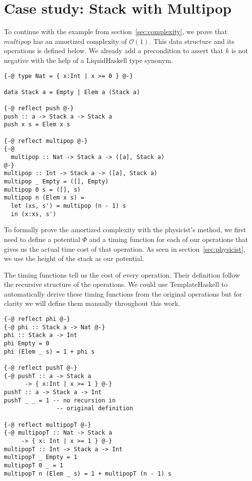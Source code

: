 \documentclass[sigplan,screen]{acmart}
\renewcommand\O[1]{$\mathcal{O}(#1)$}
\begin{document}
\section{Case study: Stack with Multipop}\label{sec:stack}

To continue with the example from section~\ref{sec:complexity}, we prove that $multipop$ has an amortized complexity of \O{1}. This data structure and its operations is defined below. We already add a precondition to assert that $k$ is not negative with the help of a LiquidHaskell type synonym.

\begin{lstlisting}
{-@ type Nat = { x:Int | x >= 0 } @-}

data Stack a = Empty | Elem a (Stack a)

{-@ reflect push @-}
push :: a -> Stack a -> Stack a
push x s = Elem x s

{-@ reflect multipop @-}
{-@
  multipop :: Nat -> Stack a -> ([a], Stack a)
@-}
multipop :: Int -> Stack a -> ([a], Stack a)
multipop _ Empty = ([], Empty)
multipop 0 s = ([], s)
multipop n (Elem x s) =
  let (xs, s') = multipop (n - 1) s
  in (x:xs, s')
\end{lstlisting}

To formally prove the amortized complexity with the physicist's method, we first need to define a potential $\Phi$ and a timing function for each of our operations that gives us the actual time cost of that operation. As seen in section~\ref{sec:physicist}, we use the height of the stack as our potential.

The timing functions tell us the cost of every operation. Their definition follow the recursive structure of the operations. We could use TemplateHaskell to automatically derive these timing functions from the original operations but for clarity we will define them manually throughout this work.

\begin{lstlisting}
{-@ reflect phi @-}
{-@ phi :: Stack a -> Nat @-}
phi :: Stack a -> Int
phi Empty = 0
phi (Elem _ s) = 1 + phi s

{-@ reflect pushT @-}
{-@ pushT :: a -> Stack a
      -> { x:Int | x >= 1 } @-}
pushT :: a -> Stack a -> Int
pushT _ _ = 1 -- no recursion in
               -- original definition

{-@ reflect multipopT @-}
{-@ multipopT :: Nat -> Stack a
     -> { x: Int | x >= 1 } @-}
multipopT :: Int -> Stack a -> Int
multipopT _ Empty = 1
multipopT 0 _ = 1
multipopT n (Elem _ s) = 1 + multipopT (n - 1) s
\end{lstlisting}
\end{document}
